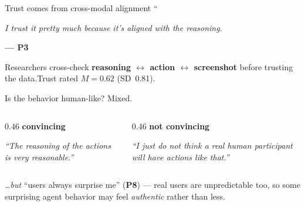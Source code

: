 \documentclass[scheme=plain,aspectratio=169]{beamer}
\begin{document}
\begin{frame}[c]{Trust comes from cross-modal alignment}
  \centering
  {\color{barpos}\fontsize{42}{42}\selectfont ``}\par
  \vspace{-0.2em}
  \begin{minipage}{0.82\linewidth}\centering
    {\LARGE\itshape I trust it pretty much because it's aligned with the reasoning.}
  \end{minipage}\par
  \vspace{0.5em}
  {\bfseries --- P3}\par
  \vspace{1.6em}
  {\small Researchers cross-check \textbf{reasoning $\leftrightarrow$ action $\leftrightarrow$ screenshot} before trusting the data.\quad Trust rated $M=0.62$ (SD~0.81).}
\end{frame}

\begin{frame}[c]{Is the behavior human-like? Mixed.}
  \begin{columns}[t]
    \begin{column}{0.46\linewidth}\centering
      {\color{barpos}\large\bfseries convincing}\par\vspace{0.5em}
      {\large\itshape ``The reasoning of the actions is very reasonable.''}\par
      \vspace{0.4em}{\bfseries --- P7}
    \end{column}
    \begin{column}{0.46\linewidth}\centering
      {\color{barneg}\large\bfseries not convincing}\par\vspace{0.5em}
      {\large\itshape ``I just do not think a real human participant will have actions like that.''}\par
      \vspace{0.4em}{\bfseries --- P6}
    \end{column}
  \end{columns}
  \vspace{1.8em}
  \centering
  {\small \emph{\dots but} ``users always surprise me'' (\textbf{P8}) --- real users are unpredictable too, so some surprising agent behavior may feel \emph{authentic} rather than less.}
\end{frame}
\end{document}
